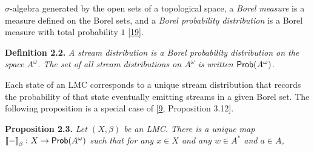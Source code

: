 \hypertarget{html:S2.SS0.SSS0.P0.SPx2.p2.m1}{}\({\sigma}\)-algebra generated by the open sets of a topological space, a \emph{Borel measure} is a measure defined on the Borel sets, and a \emph{Borel probability distribution} is a Borel measure with total probability %
\hypertarget{html:S2.SS0.SSS0.P0.SPx2.p2.m2}{}\({1}\) [\hyperlink{html:bib.bib19}{19}].
\par\medskip
\hypertarget{html:S2.Thmtheorem2}{} \par\noindent\textbf{\textbf{Definition 2.2}\textbf{.}}\quad  %
\hypertarget{html:S2.Thmtheorem2.p1}{} \emph{A \emph{stream distribution} is a Borel probability distribution on the space %
\hypertarget{html:S2.Thmtheorem2.p1.m1}{}\({A^{\omega}}\). The set of all stream distributions on %
\hypertarget{html:S2.Thmtheorem2.p1.m2}{}\({A^{\omega}}\) is written %
\hypertarget{html:S2.Thmtheorem2.p1.m3}{}\({\text{\sf Prob}(A^{\omega})}\).}
\par\medskip
\hypertarget{html:S2.SS0.SSS0.P0.SPx2.p3}{} Each state of an LMC corresponds to a unique stream distribution that records the probability of that state eventually emitting streams in a given Borel set. The following proposition is a special case of [\hyperlink{html:bib.bib9}{9}, Proposition 3.12].
\par\medskip
\hypertarget{html:S2.Thmtheorem3}{} \par\noindent\textbf{\textbf{Proposition 2.3}\textbf{.}}\quad  %
\hypertarget{html:S2.Thmtheorem3.p1}{} \emph{Let %
\hypertarget{html:S2.Thmtheorem3.p1.m1}{}\({(X,\beta)}\) be an LMC. There is a unique map %
\hypertarget{html:S2.Thmtheorem3.p1.m2}{}\({\left\llbracket{-}\right\rrbracket_{\beta}\colon X\to\text{\sf Prob}(A^{\omega})}\) such that for any %
\hypertarget{html:S2.Thmtheorem3.p1.m3}{}\({x\in X}\) and any %
\hypertarget{html:S2.Thmtheorem3.p1.m4}{}\({w\in A^{*}}\) and %
\hypertarget{html:S2.Thmtheorem3.p1.m5}{}\({a\in A}\),}
\par\medskip
\hypertarget{html:S2.Ex2}{}   %
